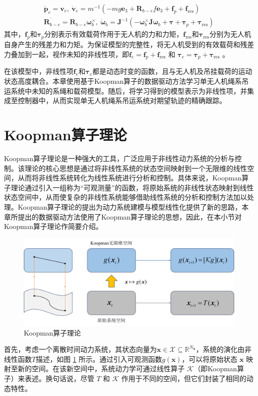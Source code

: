 \documentclass[lang=chs, degree=master, blindreview=false, winfonts=true]{yanputhesis}
\begin{document}
\begin{equation}
	\begin{aligned}
		\dot{\boldsymbol{p}}_e = \boldsymbol{v}_e, \
		\dot{\boldsymbol{v}}_e = m^{-1}\left(-mg\bm{e}_3+\boldsymbol{R}_{b-e}f\bm{e}_3+\bm{f}_p+\bm{f}_{\text{res}}\right) \\
		\dot{\bm{R}_{b-e}} = \bm{R}_{b-e} \bm{\omega}_b^{\times}, \
		\dot{\boldsymbol{\omega}}_b = \boldsymbol{J}^{-1}\left(-\bm{\omega}_b^{\times}\bm{J} \bm{\omega}_b+\boldsymbol{\tau}+ \bm{\tau}_p+ \bm{\tau}_{\text{res}}\right)
	\end{aligned}\label{3-1}
\end{equation}
其中，$\bm{f}_p$和$\bm{\tau}_p$分别表示有效载荷作用于无人机的力和力矩，$\bm{f}_\text{res}$和$\bm{\tau}_\text{res}$分别为无人机自身产生的残差力和力矩。为保证模型的完整性，将无人机受到的有效载荷和残差力叠加到一起，视作未知的非线性项，即$\bm f_e = \bm f_p+ \bm f_{\text{res}}$ 和 $\bm \tau_e = \bm \tau_p+\bm \tau_{\text{res}}$ 。
	
在该模型中，非线性项$\bm f_e$和$\bm \tau_e$都是动态时变的函数，且与无人机及吊挂载荷的运动状态高度耦合。本章使用基于Koopman算子的数据驱动方法学习单无人机绳系吊运系统中未知的系绳和载荷模型。随后，将学习得到的模型表示为非线性项，并集成至控制器中，从而实现单无人机绳系吊运系统对期望轨迹的精确跟踪。

\section{Koopman算子理论}
Koopman算子理论是一种强大的工具，广泛应用于非线性动力系统的分析与控制\cite{1931Hamiltonian}。该理论的核心思想是通过将非线性系统的状态空间映射到一个无限维的线性空间，从而将非线性系统转化为线性系统进行分析和控制。具体来说，Koopman算子理论通过引入一组称为“可观测量”的函数，将原始系统的非线性状态映射到线性状态空间中，从而使复杂的非线性系统能够借助线性系统的分析和控制方法加以处理。Koopman算子理论的提出为动力系统建模与模型线性化提供了新的思路，本章所提出的数据驱动方法使用了Koopman算子理论的思想，因此，在本小节对Koopman算子理论作简要介绍。

\begin{figure}[hbt!]
	\centering
	\includegraphics[width=32pc]{picture/3_1.png} 
	\caption{Koopman算子理论} \label{3_1}
\end{figure}
首先，考虑一个离散时间动力系统，其状态向量为$\bm{x} \in \mathcal{X} \subseteq \mathbb{R}^{N_{\bm{x}}}$，系统的演化由非线性函数$T$描述，如图 \ref{3_1} 所示。通过引入可观测函数$g(\bm{x})$，可以将原始状态 $\bm{x}$ 映射至新的空间。在该新空间中，系统动力学可通过线性算子 $\mathcal{K}$（即Koopman算子）来表述。换句话说，尽管 $T$ 和 $\mathcal{K}$ 作用于不同的空间，但它们封装了相同的动态特性。
\end{document}
